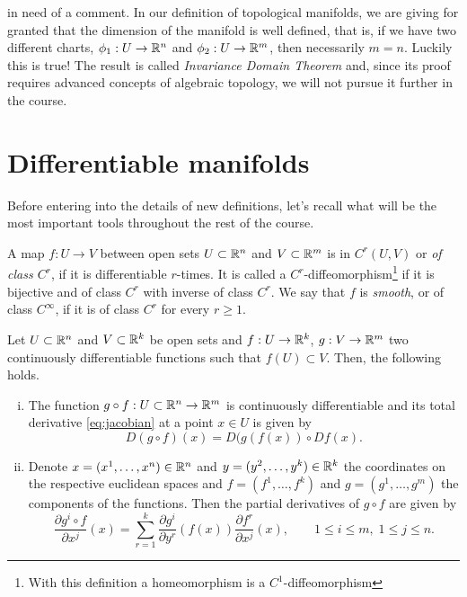  in need of a comment.
In our definition of topological manifolds, we are giving for granted that the dimension of the manifold is well defined, that is, if we have two different charts, $\phi_1: U \to \mathbb{R}^n$ and $\phi_2: U \to \mathbb{R}^m$, then necessarily $m=n$. Luckily this is true! The result is called \emph{Invariance Domain Theorem} and, since its proof requires advanced concepts of algebraic topology, we will not pursue it further in the course.

\section{Differentiable manifolds}

Before entering into the details of new definitions, let's recall what will be the most important tools throughout the rest of the course.

\begin{definition}
  A map $f: U \to V$ between open sets $U\subset\mathbb{R}^n$ and $V\subset\mathbb{R}^m$ is in $C^r(U,V)$ or \emph{of class $C^r$}, if it is differentiable $r$-times.
  It is called a $C^r$-diffeomorphism\footnote{With this definition a homeomorphism is a $C^1$-diffeomorphism} if it is bijective and of class $C^r$ with inverse of class $C^r$.
  We say that $f$ is \emph{smooth}, or of class $C^\infty$, if it is of class $C^r$ for every $r \geq 1$.
\end{definition}

\begin{theorem}\label{thm:chainrule}
Let $U\subset\mathbb{R}^n$ and $V\subset\mathbb{R}^k$ be open sets and $f: U \to \mathbb{R}^k$, $g: V\to\mathbb{R}^m$ two continuously differentiable functions such that $f(U)\subset V$.
Then, the following holds.
\begin{enumerate}[(i)]
  \item\label{thm:chainrule1} The function $g\circ f: U\subset\mathbb{R}^n \to\mathbb{R}^m$ is continuously differentiable and its total derivative \eqref{eq:jacobian} at a point $x\in U$ is given by
\begin{equation}
  D(g\circ f)(x) = D(g(f(x)) \circ Df(x).
\end{equation}
\item\label{thm:chainrule2} Denote $x=(x^1, \ldots, x^n)\in\mathbb{R}^n$ and $y=(y^2,\ldots,y^k)\in\mathbb{R}^k$ the coordinates on the respective euclidean spaces and $f=(f^1,\ldots,f^k)$ and $g=(g^1,\ldots,g^m)$ the components of the functions. Then the partial derivatives of $g\circ f$ are given by
\begin{equation}
  \frac{\partial g^i\circ f}{\partial x^j}(x)
  = \sum_{r=1}^k \frac{\partial g^i}{\partial y^r}(f(x)) \frac{\partial f^r}{\partial x^j}(x),
\qquad 1\leq i \leq m,\; 1\leq j\leq n.
\end{equation}
\end{enumerate}
\end{theorem}

